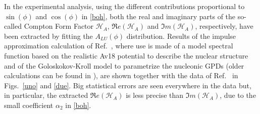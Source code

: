\documentclass[times, twoside]{PosWhiPap}
\begin{document}
In the experimental analysis, using the different contributions proportional to
$\sin(\phi)$ and $\cos(\phi)$ in \eqref{boh}, both the real and imaginary parts 
of the so-called Compton Form Factor $\mathcal{H}_{A}$, 
$\Re e(\mathcal{H}_{A})$ and $\Im m(\mathcal{H}_{A})$, respectively,
have been extracted by fitting the $A_{LU}(\phi)$ distribution. Results of the 
impulse approximation calculation of Ref.~\cite{Fucini:2018gso}, 
where use is made of a model spectral function
based on the realistic Av18 potential to describe the nuclear
structure and of the Goloskokov-Kroll model to parametrize the nucleonic GPDs
(older calculations can be found in
\cite{Liuti:2005gi,Guzey:2003jh}), are shown together with the data of 
Ref.~\cite{Hattawy:2017woc} in Figs.~\ref{uno} and \ref{due}.
Big statistical errors are seen everywhere in the data but, in particular, the extracted $\Re 
e(\mathcal{H}_{A})$ is less precise than $\Im m(\mathcal{H}_{A})$, due to the small 
coefficient $\alpha_2$ in \eqref{boh}.
\end{document}

